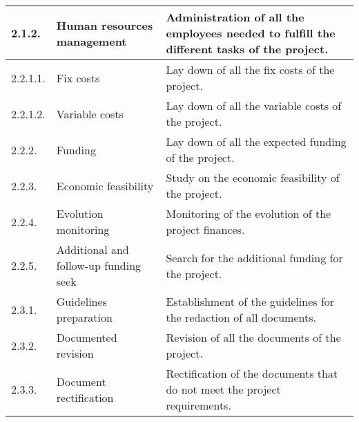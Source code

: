 \begin{longtable}[H]{l >{\raggedright\arraybackslash}p{4cm} p{8cm}}
	\midrule
	
	2.1.2. & Human resources management & Administration of all the employees needed to fulfill the different tasks of the project.\vspace{0.2cm} \\
	
	\midrule
	
	2.2.1.1. & Fix costs & Lay down of all the fix costs of the project.\vspace{0.2cm} \\
	
	\midrule
	
	2.2.1.2. & Variable costs & Lay down of all the variable costs of the project.\vspace{0.2cm} \\
	
	\midrule
	
	2.2.2. & Funding & Lay down of all the expected funding of the project.\vspace{0.2cm} \\
	
	\midrule
	
	2.2.3. & Economic feasibility & Study on the economic feasibility of the project.\vspace{0.2cm} \\
	
	\midrule
	
	2.2.4. & Evolution monitoring & Monitoring of the evolution of the project finances.\vspace{0.2cm} \\
	
	\midrule
	
	2.2.5. & Additional and follow-up funding seek & Search for the additional funding for the project.\vspace{0.2cm} \\
	
	\midrule
	
	2.3.1. & Guidelines preparation & Establishment of the guidelines for the redaction of all documents.\vspace{0.2cm} \\
	
	\midrule
	
	2.3.2. & Documented revision & Revision of all the documents of the project.\vspace{0.2cm} \\
	
	\midrule
	
	2.3.3. & Document rectification & Rectification of the documents that do not meet the project requirements.\vspace{0.2cm} \\
	

\end{longtable}
